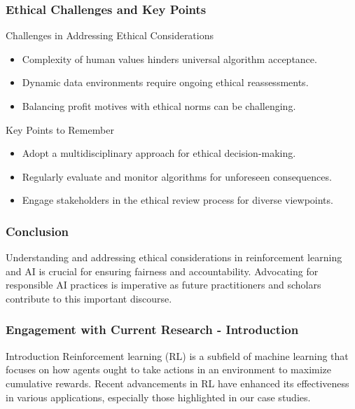 \documentclass[aspectratio=169]{beamer}
\begin{document}
\begin{frame}[fragile]
    \frametitle{Ethical Challenges and Key Points}
    \begin{block}{Challenges in Addressing Ethical Considerations}
        \begin{itemize}
            \item Complexity of human values hinders universal algorithm acceptance.
            \item Dynamic data environments require ongoing ethical reassessments.
            \item Balancing profit motives with ethical norms can be challenging.
        \end{itemize}
    \end{block}
    
    \begin{block}{Key Points to Remember}
        \begin{itemize}
            \item Adopt a multidisciplinary approach for ethical decision-making.
            \item Regularly evaluate and monitor algorithms for unforeseen consequences.
            \item Engage stakeholders in the ethical review process for diverse viewpoints.
        \end{itemize}
    \end{block}
\end{frame}

\begin{frame}[fragile]
    \frametitle{Conclusion}
    Understanding and addressing ethical considerations in reinforcement learning and AI is crucial for ensuring fairness and accountability. Advocating for responsible AI practices is imperative as future practitioners and scholars contribute to this important discourse.
\end{frame}

\begin{frame}[fragile]
    \frametitle{Engagement with Current Research - Introduction}
    \begin{block}{Introduction}
        Reinforcement learning (RL) is a subfield of machine learning that focuses on how agents ought to take actions in an environment to maximize cumulative rewards. Recent advancements in RL have enhanced its effectiveness in various applications, especially those highlighted in our case studies.
    \end{block}
\end{frame}
\end{document}
